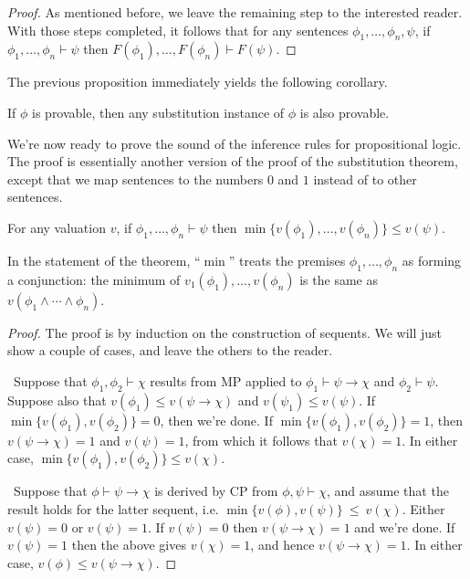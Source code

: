 \begin{proof}
\bigskip \noindent As mentioned before, we leave the remaining step to
the interested reader.  With those steps completed, it follows that
for any sentences $\phi _1,\dots ,\phi _n,\psi$, if
$\phi _1,\dots ,\phi _n\vdash\psi$ then
$F(\phi _1),\dots ,F(\phi _n)\vdash F(\psi )$.
\end{proof}

The previous proposition immediately yields the following corollary.

\begin{prop} If $\phi$ is provable, then any substitution instance of
  $\phi$ is also provable. \end{prop}

We're now ready to prove the \gls{sound} of the inference rules for
propositional logic.  The proof is essentially another version of the
proof of the substitution theorem, except that we map sentences to the
numbers $0$ and $1$ instead of to other sentences.

\begin{sothm} For any valuation $v$, if
  $\phi _1,\dots ,\phi _n\vdash\psi$ then
  $\min \{ v(\phi _1),\dots ,v(\phi _n) \}\leq v(\psi )$.  \end{sothm}

In the statement of the theorem, ``$\min$'' treats the premises
$\phi _1,\dots ,\phi _n$ as forming a conjunction: the minimum of
$v_1(\phi _1),\dots ,v(\phi _n)$ is the same as
$v(\phi _1\wedge\cdots\wedge \phi _n)$.

\begin{proof} The proof is by induction on the construction of
  sequents.  We will just show a couple of cases, and leave the others
  to the reader.

  \bigskip\noindent {} \, Suppose that $\phi _1,\phi _2\vdash\chi$ results
  from MP applied to $\phi _1\vdash \psi\to\chi$ and $\phi
  _2\vdash\psi$.  Suppose also that $v(\phi _1)\leq v(\psi\to\chi )$
  and $v(\psi _1)\leq v(\psi )$.  If $\min \{ v(\phi _1),v(\phi _2)
  \}=0$, then we're done.  If $\min \{ v(\phi _1),v(\phi _2) \}=1$,
  then $v(\psi\to \chi )=1$ and $v(\psi )=1$, from which it follows
  that $v(\chi )=1$.  In either case, $\min \{ v(\phi _1),v(\phi
  _2)\}\leq v(\chi )$.   

  \bigskip\noindent {} \, Suppose that
  $\phi \vdash \psi\to \chi$ is derived by CP from
  $\phi ,\psi\vdash \chi$, and assume that the result holds for the
  latter sequent, i.e.
  $\min \{ v(\phi ),v(\psi ) \} \:\leq\: v(\chi )$. Either
  $v(\psi )=0$ or $v(\psi )=1$.  If $v(\psi )=0$ then
  $v(\psi\to\chi )=1$ and we're done.  If $v(\psi )=1$ then the above
  gives $v(\chi )=1$, and hence $v(\psi\to\chi )=1$.  In either case,
  $v(\phi )\leq v(\psi\to\chi )$.
\end{proof}

